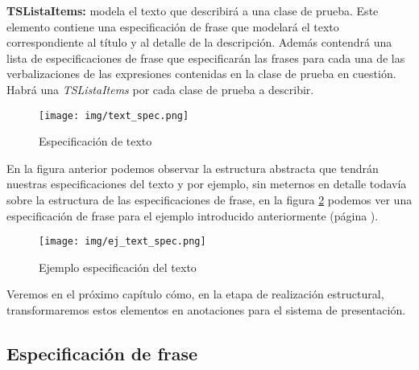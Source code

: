 \medskip
\noindent
\textbf{TSListaItems:} modela el texto que describirá a una clase de prueba. Este elemento contiene una especificación de frase que modelará el texto correspondiente al título y al detalle de la descripción. Además contendrá una lista de especificaciones de frase que especificarán las frases para cada una de las verbalizaciones de las expresiones contenidas en la clase de prueba en cuestión. Habrá una \emph{TSListaItems} por cada clase de prueba a describir.

\begin{figure}[H]
  	\centering
	\texttt{[image: img/text\_spec.png]}
	\caption{Especificación de texto}
  	\label{fig:text_spec}
\end{figure}

En la figura anterior podemos observar la estructura abstracta que tendrán nuestras especificaciones del texto y por ejemplo, sin meternos en detalle todavía sobre la estructura de las especificaciones de frase, en la figura \ref{fig:text_spec_ej} podemos ver una especificación de frase para el ejemplo introducido anteriormente (página \pageref{fig:ej_corpus}).

\begin{figure}[H]
  	\centering
	\texttt{[image: img/ej\_text\_spec.png]}
	\caption{Ejemplo especificación del texto}
  \label{fig:text_spec_ej}
\end{figure}

Veremos en el próximo capítulo cómo, en la etapa de realización estructural, transformaremos estos elementos en anotaciones para el sistema de presentación.

\subsection{Especificación de frase}

